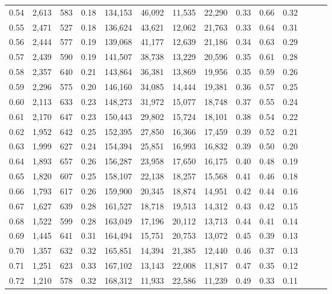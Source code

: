 \begin{tabular}{rrrrrrrrrrrrrr}
0.54 &  2,613 &    583 &  0.18 &  134,153 &   46,092 &  11,535 &  22,290 &  0.33 &  0.66 &      0.32 \\
0.55 &  2,471 &    527 &  0.18 &  136,624 &   43,621 &  12,062 &  21,763 &  0.33 &  0.64 &      0.31 \\
0.56 &  2,444 &    577 &  0.19 &  139,068 &   41,177 &  12,639 &  21,186 &  0.34 &  0.63 &      0.29 \\
0.57 &  2,439 &    590 &  0.19 &  141,507 &   38,738 &  13,229 &  20,596 &  0.35 &  0.61 &      0.28 \\
0.58 &  2,357 &    640 &  0.21 &  143,864 &   36,381 &  13,869 &  19,956 &  0.35 &  0.59 &      0.26 \\
0.59 &  2,296 &    575 &  0.20 &  146,160 &   34,085 &  14,444 &  19,381 &  0.36 &  0.57 &      0.25 \\
0.60 &  2,113 &    633 &  0.23 &  148,273 &   31,972 &  15,077 &  18,748 &  0.37 &  0.55 &      0.24 \\
0.61 &  2,170 &    647 &  0.23 &  150,443 &   29,802 &  15,724 &  18,101 &  0.38 &  0.54 &      0.22 \\
0.62 &  1,952 &    642 &  0.25 &  152,395 &   27,850 &  16,366 &  17,459 &  0.39 &  0.52 &      0.21 \\
0.63 &  1,999 &    627 &  0.24 &  154,394 &   25,851 &  16,993 &  16,832 &  0.39 &  0.50 &      0.20 \\
0.64 &  1,893 &    657 &  0.26 &  156,287 &   23,958 &  17,650 &  16,175 &  0.40 &  0.48 &      0.19 \\
0.65 &  1,820 &    607 &  0.25 &  158,107 &   22,138 &  18,257 &  15,568 &  0.41 &  0.46 &      0.18 \\
0.66 &  1,793 &    617 &  0.26 &  159,900 &   20,345 &  18,874 &  14,951 &  0.42 &  0.44 &      0.16 \\
0.67 &  1,627 &    639 &  0.28 &  161,527 &   18,718 &  19,513 &  14,312 &  0.43 &  0.42 &      0.15 \\
0.68 &  1,522 &    599 &  0.28 &  163,049 &   17,196 &  20,112 &  13,713 &  0.44 &  0.41 &      0.14 \\
0.69 &  1,445 &    641 &  0.31 &  164,494 &   15,751 &  20,753 &  13,072 &  0.45 &  0.39 &      0.13 \\
0.70 &  1,357 &    632 &  0.32 &  165,851 &   14,394 &  21,385 &  12,440 &  0.46 &  0.37 &      0.13 \\
0.71 &  1,251 &    623 &  0.33 &  167,102 &   13,143 &  22,008 &  11,817 &  0.47 &  0.35 &      0.12 \\
0.72 &  1,210 &    578 &  0.32 &  168,312 &   11,933 &  22,586 &  11,239 &  0.49 &  0.33 &      0.11 \\

\end{tabular}
